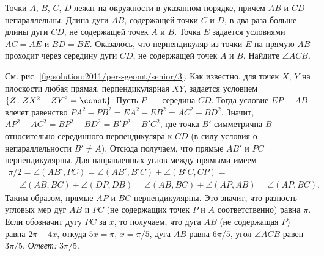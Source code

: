 Точки $A$, $B$, $C$, $D$ лежат на окружности в указанном порядке, причем $AB$ и
$CD$ непараллельны.
Длина дуги $AB$, содержащей точки $C$ и $D$, в два раза больше длины дуги $CD$,
не содержащей точек $A$ и $B$.
Точка $E$ задается условиями $AC = AE$ и $BD = BE$.
Оказалось, что перпендикуляр из точки $E$ на прямую $AB$ проходит через
середину дуги $CD$, не содержащей точек $A$ и $B$.
Найдите $\angle ACB$.



%
\label{solution:2011/pers-geomt/senior/3}%
См. рис. \ref{fig:solution:2011/pers-geomt/senior/3}.
Как известно, для точек $X$, $Y$ на плоскости любая прямая, перпендикулярная
$XY$, задается условием
$\{Z \colon ZX^2 - ZY^2 = \const\}$.
Пусть $P$~--- середина $CD$.
Тогда условие $EP \perp AB$ влечет равенство
$P A^2 - P B^2 = E A^2 - E B^2 = A C^2 - B D^2$.
Значит, $A P^2 - A C^2 = B P^2 - B D^2 = B' P^2 - B' C^2$, где точка $B'$
симметрична $B$ относительно серединного перпендикуляра к $CD$
(в силу условия о непараллельности $B' \ne A$).
Отсюда получаем, что прямые $AB'$ и $PC$ перпендикулярны.
Для направленных углов между прямыми имеем 
\begin{gather*}
    \pi / 2
=
    \angle (AB', PC)
=
    \angle (AB', B'C) + \angle (B'C, CP)
=\\=
    \angle (AB, BC) + \angle (DP, DB)
=
    \angle (AB, BC) + \angle (AP, AB)
=
    \angle (AP, BC)
.\end{gather*}
Таким образом, прямые $AP$ и $BC$ перпендикулярны.
Это значит, что разность угловых мер дуг $AB$ и $PC$
(не содержащих точек $P$ и $A$ соответственно) равна $\pi$.
Если обозначит дугу $PC$ за $x$, то получаем, что дуга $AB$
(не содержащая $P$) равна $2 \pi - 4 x$, откуда $5 x = \pi$, $x = \pi / 5$,
дуга $AB$ равна $6 \pi / 5$, угол $\angle ACB$ равен $3 \pi / 5$.
\emph{Ответ:} $3 \pi / 5$.

